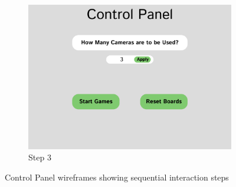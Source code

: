 \begin{figure}[h!]
    \begin{subfigure}[h!]{0.45\linewidth}
        \centering
        \includegraphics[width=\linewidth]{figures/methods/wireframes/control-panel-3.png}
        \caption{Step 3}
        \label{fig:control-panel-3}
    \end{subfigure}
    
    \caption{Control Panel wireframes showing sequential interaction steps}
    \label{fig:control-panel-group}
\end{figure}

